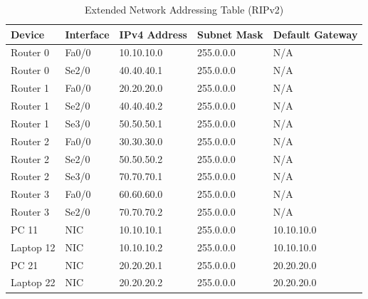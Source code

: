 \documentclass[11pt]{article}
\begin{document}
\begin{table}[h!]
    \centering
    \caption{Extended Network Addressing Table (RIPv2)}
    \begin{tabular}{@{}lllll@{}}
        \toprule
        \textbf{Device} & \textbf{Interface} & \textbf{IPv4 Address} & \textbf{Subnet Mask} & \textbf{Default Gateway} \\ \midrule
        Router 0        & Fa0/0              & 10.10.10.0            & 255.0.0.0            & N/A                      \\
        Router 0        & Se2/0              & 40.40.40.1            & 255.0.0.0            & N/A                      \\
        Router 1        & Fa0/0              & 20.20.20.0            & 255.0.0.0            & N/A                      \\
        Router 1        & Se2/0              & 40.40.40.2            & 255.0.0.0            & N/A                      \\
        Router 1        & Se3/0              & 50.50.50.1            & 255.0.0.0            & N/A                      \\
        Router 2        & Fa0/0              & 30.30.30.0            & 255.0.0.0            & N/A                      \\
        Router 2        & Se2/0              & 50.50.50.2            & 255.0.0.0            & N/A                      \\
        Router 2        & Se3/0              & 70.70.70.1            & 255.0.0.0            & N/A                      \\
        Router 3        & Fa0/0              & 60.60.60.0            & 255.0.0.0            & N/A                      \\
        Router 3        & Se2/0              & 70.70.70.2            & 255.0.0.0            & N/A                      \\
        PC 11           & NIC                & 10.10.10.1            & 255.0.0.0            & 10.10.10.0               \\
        Laptop 12       & NIC                & 10.10.10.2            & 255.0.0.0            & 10.10.10.0               \\
        PC 21           & NIC                & 20.20.20.1            & 255.0.0.0            & 20.20.20.0               \\
        Laptop 22       & NIC                & 20.20.20.2            & 255.0.0.0            & 20.20.20.0               \\

\end{tabular}
\end{table}
\end{document}
